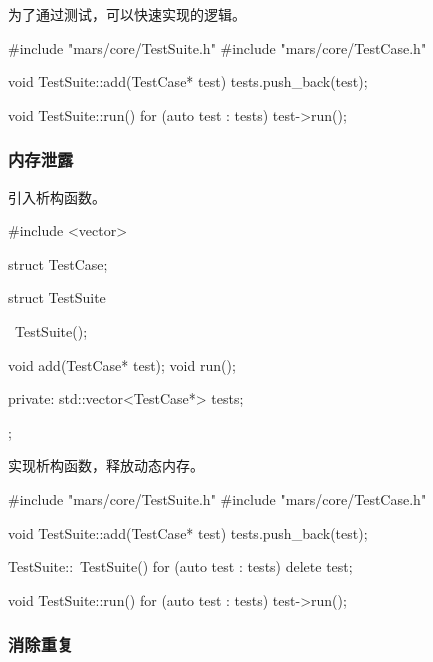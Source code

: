 \begin{content}
为了通过测试，可以快速实现的逻辑。

\begin{leftbar}
 \begin{c++}[caption={\ttfamily{src/mars/core/TestSuite.cc}}]
#include "mars/core/TestSuite.h"
#include "mars/core/TestCase.h"

void TestSuite::add(TestCase* test) {
  tests.push_back(test);
}

void TestSuite::run() {
  for (auto test : tests) {
    test->run();
  }
}
 \end{c++}
\end{leftbar}

\subsubsection{内存泄露}

引入析构函数。

\begin{leftbar}
 \begin{c++}[caption={\ttfamily{include/mars/core/TestSuite.h}}]
#include <vector>

struct TestCase;

struct TestSuite {
  ~TestSuite();

  void add(TestCase* test);
  void run();

private:
  std::vector<TestCase*> tests;
};
 \end{c++}
\end{leftbar}

实现析构函数，释放动态内存。

\begin{leftbar}
 \begin{c++}[caption={\ttfamily{src/mars/core/TestSuite.cc}}]
#include "mars/core/TestSuite.h"
#include "mars/core/TestCase.h"

void TestSuite::add(TestCase* test) {
  tests.push_back(test);
}

TestSuite::~TestSuite() {
  for (auto test : tests) {
    delete test;
  }
}

void TestSuite::run() {
  for (auto test : tests) {
    test->run();
  }
}
 \end{c++}
\end{leftbar}

\subsubsection{消除重复}


\end{content}
